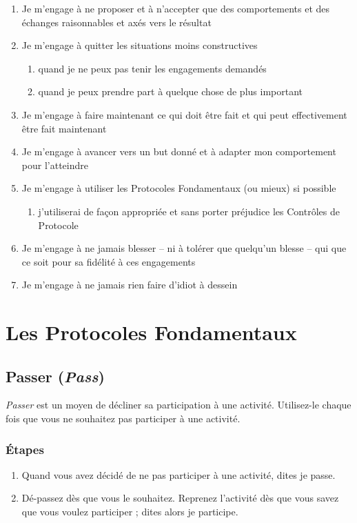 \documentclass{book}
\begin{document}
\begin{enumerate}
	\item Je m'engage à ne proposer et à n'accepter que des comportements et des échanges raisonnables et axés vers le résultat
	\item Je m'engage à quitter les situations moins constructives
	\begin{enumerate}
		\item quand je ne peux pas tenir les engagements demandés
		\item quand je peux prendre part à quelque chose de plus important
	\end{enumerate}
	\item Je m'engage à faire maintenant ce qui doit être fait et qui peut effectivement être fait maintenant
	\item Je m'engage à avancer vers un but donné et à adapter mon comportement pour l'atteindre
	\item Je m'engage à utiliser les Protocoles Fondamentaux (ou mieux) si possible
	\begin{enumerate}
		\item j'utiliserai de façon appropriée et sans porter préjudice les Contrôles de Protocole
	\end{enumerate}
	\item Je m'engage à ne jamais blesser -- ni à tolérer que quelqu'un blesse -- qui que ce soit pour sa fidélité à ces engagements
	\item Je m'engage à ne jamais rien faire d'idiot à dessein
\end{enumerate}

\chapter{Les Protocoles Fondamentaux} \label{core-protocols}

\section{Passer (\emph{Pass})} \label{protocole-passer}

\emph{Passer} est un moyen de décliner sa participation à une activité. Utilisez-le chaque fois que vous ne souhaitez pas 
participer à une activité.

\subsection{Étapes}
\begin{enumerate}
	\item Quand vous avez décidé de ne pas participer à une activité, dites \og{}je passe\fg{}.
	\item \og{}Dé-passez\fg{} dès que vous le souhaitez. Reprenez l'activité dès que vous savez que vous voulez participer ; 
	      dites alors \og{}je participe\fg{}.
\end{enumerate}
\end{document}
